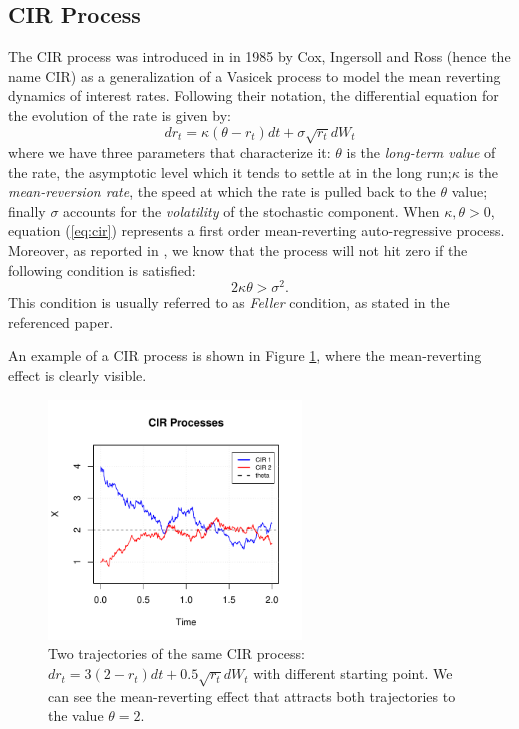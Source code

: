 \subsection{CIR Process}
The CIR process was introduced in \citep{CIR85} in 1985 by Cox, Ingersoll and Ross (hence the name CIR) as a generalization of a Vasicek process \citep{VASICEK77} to model the mean reverting dynamics of interest rates.
Following their notation, the differential equation for the  evolution of the rate is given by:
\begin{equation}
\label{eq:cir}
	dr_t = \kappa(\theta - r_t) dt + \sigma \sqrt{r_t}dW_t
\end{equation}
where we have three parameters that characterize it: $\theta$ is the \textit{long-term value} of the rate, the asymptotic level which it tends to settle at in the long run;$\kappa$ is the \textit{mean-reversion rate}, the speed at which the rate is pulled back to the $\theta$ value; finally $\sigma$ accounts for the \textit{volatility} of the stochastic component.
When $\kappa,\theta >0$, equation (\ref{eq:cir}) represents a first order mean-reverting auto-regressive process. Moreover, as reported in \citep{HESTONTRAP}, we know that the process will not hit zero if the following condition is satisfied:
\begin{equation}
	2\kappa\theta > \sigma^2.
\end{equation}
This condition is usually referred to as \textit{Feller} condition, as stated in the referenced paper.

An example of a CIR process is shown in Figure \ref{fig:cir_proc}, where the mean-reverting effect is  clearly visible.

\begin{figure}
	\centering
	\includegraphics[width=0.6\textwidth]{Images/cir_process.pdf}
	\caption[Trajectories of two CIR processes]{Two trajectories of the same CIR process: $dr_t = 3(2 - r_t) dt + 0.5 \sqrt{r_t}dW_t$ with different starting point. We can see the mean-reverting effect that attracts both trajectories to the value $\theta=2$. }
	\label{fig:cir_proc}
\end{figure}

